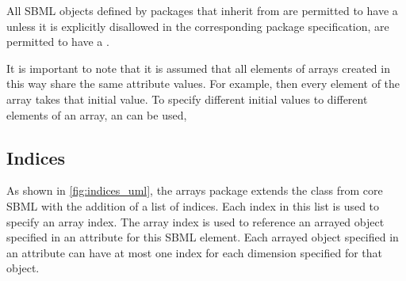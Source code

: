 All SBML objects defined by packages that inherit from \SBase are permitted to have a \ListOfDimensions unless it is explicitly disallowed in the corresponding package specification,  are permitted to have a \ListOfDimensions.

It is important to note that it is assumed that all elements of arrays created in this way share the same attribute values.   For example,    then every element of the array takes that initial value.   To specify different initial values to different elements of an array, an \InitialAssignment can be used, 

\subsection{Indices}
\label{sec:index}

As shown in \ref{fig:indices_uml}, the arrays package extends the \SBase class from core SBML with the addition of a list of indices.
Each index in this list is used to specify an array index. The array index is used to reference an arrayed object specified in an attribute for this SBML element.
Each arrayed object specified in an attribute can have at most one index for each dimension specified for that object.

